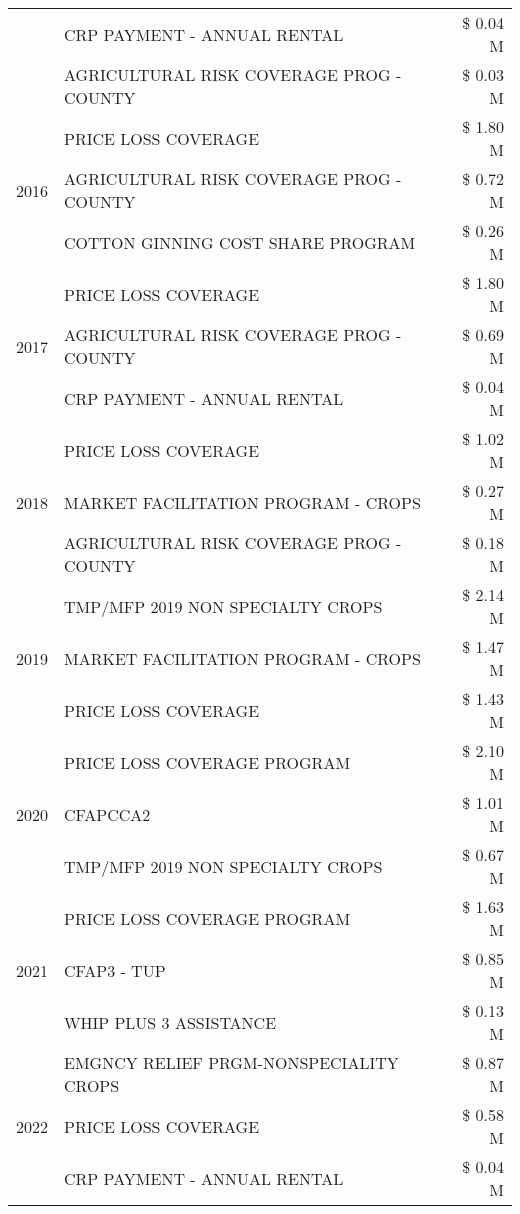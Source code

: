 \begin{tabular}{llr}
 & CRP PAYMENT - ANNUAL RENTAL & \$ 0.04 M \\
 & AGRICULTURAL RISK COVERAGE PROG - COUNTY & \$ 0.03 M \\
\cline{1-3}
\multirow[t]{3}{*}{2016} & PRICE LOSS COVERAGE & \$ 1.80 M \\
 & AGRICULTURAL RISK COVERAGE PROG - COUNTY & \$ 0.72 M \\
 & COTTON GINNING COST SHARE PROGRAM & \$ 0.26 M \\
\cline{1-3}
\multirow[t]{3}{*}{2017} & PRICE LOSS COVERAGE & \$ 1.80 M \\
 & AGRICULTURAL RISK COVERAGE PROG - COUNTY & \$ 0.69 M \\
 & CRP PAYMENT - ANNUAL RENTAL & \$ 0.04 M \\
\cline{1-3}
\multirow[t]{3}{*}{2018} & PRICE LOSS COVERAGE & \$ 1.02 M \\
 & MARKET FACILITATION PROGRAM - CROPS & \$ 0.27 M \\
 & AGRICULTURAL RISK COVERAGE PROG - COUNTY & \$ 0.18 M \\
\cline{1-3}
\multirow[t]{3}{*}{2019} & TMP/MFP 2019 NON SPECIALTY CROPS & \$ 2.14 M \\
 & MARKET FACILITATION PROGRAM - CROPS & \$ 1.47 M \\
 & PRICE LOSS COVERAGE & \$ 1.43 M \\
\cline{1-3}
\multirow[t]{3}{*}{2020} & PRICE LOSS COVERAGE PROGRAM & \$ 2.10 M \\
 & CFAPCCA2 & \$ 1.01 M \\
 & TMP/MFP 2019 NON SPECIALTY CROPS & \$ 0.67 M \\
\cline{1-3}
\multirow[t]{3}{*}{2021} & PRICE LOSS COVERAGE PROGRAM & \$ 1.63 M \\
 & CFAP3 - TUP & \$ 0.85 M \\
 & WHIP PLUS 3 ASSISTANCE & \$ 0.13 M \\
\cline{1-3}
\multirow[t]{3}{*}{2022} & EMGNCY RELIEF PRGM-NONSPECIALITY CROPS & \$ 0.87 M \\
 & PRICE LOSS COVERAGE & \$ 0.58 M \\
 & CRP PAYMENT - ANNUAL RENTAL & \$ 0.04 M \\
\cline{1-3}
\bottomrule
\end{tabular}
